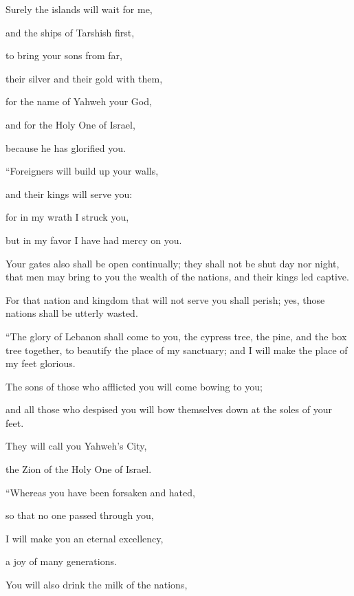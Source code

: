 {\par }{\Q {}Surely the islands will wait for me,
\par }{\QB and the ships of Tarshish first,
\par }{\Q to bring your sons from far,
\par }{\QB their silver and their gold with them,
\par }{\Q for the name of Yahweh your God,
\par }{\QB and for the Holy One of Israel,
\par }{\QB because he has glorified you.
\par }{\BB \par }{\Q {}“Foreigners will build up your walls,
\par }{\QB and their kings will serve you:
\par }{\Q for in my wrath I struck you,
\par }{\QB but in my favor I have had mercy on you.
\par }{\Q {}Your gates also shall be open continually; they shall not be shut day nor night, that men may bring to you the wealth of the nations, and their kings led captive.
\par }{\Q {}For that nation and kingdom that will not serve you shall perish; yes, those nations shall be utterly wasted.
\par }{\BB \par }{\Q {}“The glory of Lebanon shall come to you, the cypress tree, the pine, and the box tree together, to beautify the place of my sanctuary; and I will make the place of my feet glorious.
\par }{\Q {}The sons of those who afflicted you will come bowing to you;
\par }{\QB and all those who despised you will bow themselves down at the soles of your feet.
\par }{\Q They will call you Yahweh’s City,
\par }{\QB the Zion of the Holy One of Israel.
\par }{\BB \par }{\Q {}“Whereas you have been forsaken and hated,
\par }{\QB so that no one passed through you,
\par }{\Q I will make you an eternal excellency,
\par }{\QB a joy of many generations.
\par }{\Q {}You will also drink the milk of the nations,
}
